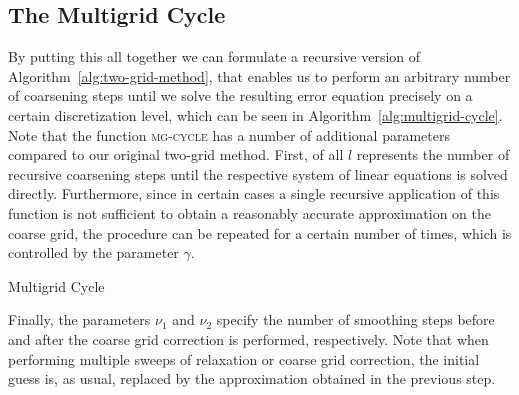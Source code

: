 \subsection{The Multigrid Cycle}\label{sec:multigrid-cycles}
By putting this all together we can formulate a recursive version of Algorithm~\ref{alg:two-grid-method}, that enables us to perform an arbitrary number of coarsening steps until we solve the resulting error equation precisely on a certain discretization level, which can be seen in Algorithm~\ref{alg:multigrid-cycle}.
Note that the function \textsc{mg-cycle} has a number of additional parameters compared to our original two-grid method.
First, of all $l$ represents the number of recursive coarsening steps until the respective system of linear equations is solved directly.
Furthermore, since in certain cases a single recursive application of this function is not sufficient to obtain a reasonably accurate approximation on the coarse grid, the procedure can be repeated for a certain number of times, which is controlled by the parameter $\gamma$.
\begin{algorithm}
	\caption{Multigrid Cycle}
	\label{alg:multigrid-cycle}
	\begin{algorithmic}
		\EndFor
		\Else
		\EndFor
		\EndIf
		\EndFor
		\State {}
		\EndFunction
	\end{algorithmic}
\end{algorithm}
Finally, the parameters $\nu_1$ and $\nu_2$ specify the number of smoothing steps before and after the coarse grid correction is performed, respectively.
Note that when performing multiple sweeps of relaxation or coarse grid correction, the initial guess is, as usual, replaced by the approximation obtained in the previous step.
